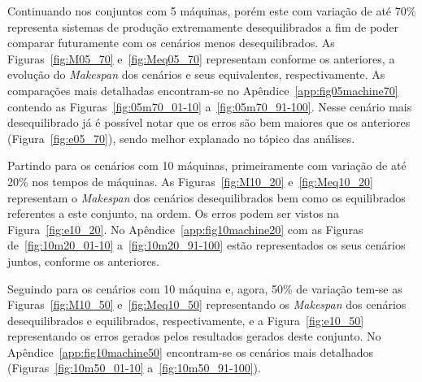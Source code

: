    
    
    
    
    
    
    Continuando nos conjuntos com 5 máquinas, porém este com variação de até 70\% representa sistemas de produção extremamente desequilibrados a fim de poder comparar futuramente com os cenários menos desequilibrados. As Figuras~\ref{fig:M05_70} e~\ref{fig:Meq05_70} representam conforme os anteriores, a evolução do \textit{Makespan} dos cenários e seus equivalentes, respectivamente. As comparações mais detalhadas encontram-se no Apêndice~\ref{app:fig05machine70} contendo as Figuras~\ref{fig:05m70_01-10} a~\ref{fig:05m70_91-100}. Nesse cenário mais desequilibrado já é possível notar que os erros são bem maiores que os anteriores (Figura~\ref{fig:e05_70}), sendo melhor explanado no tópico das análises.
    
    
    
    
    
    
    
    Partindo para os cenários com 10 máquinas, primeiramente com variação de até 20\% nos tempos de máquinas. As Figuras~\ref{fig:M10_20} e~\ref{fig:Meq10_20} representam o \textit{Makespan} dos cenários desequilibrados bem como os equilibrados referentes a este conjunto, na ordem. Os erros podem ser vistos na Figura~\ref{fig:e10_20}. No Apêndice~\ref{app:fig10machine20} com as Figuras de~\ref{fig:10m20_01-10} a~\ref{fig:10m20_91-100} estão representados os seus cenários juntos, conforme os anteriores.
    
    
    
    
    
    
    
    Seguindo para os cenários com 10 máquina e, agora, 50\% de variação tem-se as Figuras~\ref{fig:M10_50} e~\ref{fig:Meq10_50} representando os \textit{Makespan} dos cenários desequilibrados e equilibrados, respectivamente, e a Figura~\ref{fig:e10_50} representando os erros gerados pelos resultados gerados deste conjunto. No Apêndice~\ref{app:fig10machine50} encontram-se os cenários mais detalhados (Figuras~\ref{fig:10m50_01-10} a~\ref{fig:10m50_91-100}).
    
